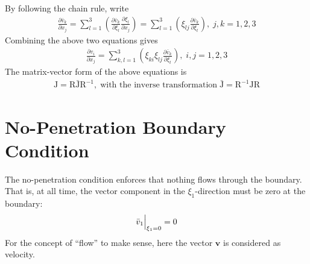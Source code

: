 \documentclass[a4paper,12pt,dvips]{article}
\begin{document}
By following the chain rule, write
\begin{align*}
  \frac{\partial \bar{v}_k}{\partial x_j}
  = \sum_{l=1}^3
    \left(
      \frac{\partial \bar{v}_k}{\partial \xi_l}
      \frac{\partial \xi_l}{\partial x_j}
    \right)
  = \sum_{l=1}^3
    \left( \xi_{lj} \frac{\partial \bar{v}_k}{\partial \xi_l} \right),
  \; j,k = 1, 2, 3
\end{align*}
Combining the above two equations gives
\begin{align*}
  \frac{\partial v_i}{\partial x_j}
  = \sum_{k,l=1}^3
    \left(
      \xi_{ki} \xi_{lj} \frac{\partial \bar{v}_k}{\partial \xi_l}
    \right),
  \; i,j = 1, 2, 3
\end{align*}
The matrix-vector form of the above equations is
\begin{align}
  \mathrm{J} = \mathrm{R\bar{J}R^{-1}},
  \; \mbox{with the inverse transformation} \;
  \bar{\mathrm{J}} = \mathrm{R^{-1}JR}
  \label{e:rotjac}
\end{align}

\section{No-Penetration Boundary Condition}

The no-penetration condition enforces that nothing flows through the boundary.
That is, at all time, the vector component in the $\xi_1$-direction must be
zero at the boundary:
\begin{align*}
  \Bigl.\bar{v}_1\Bigr|_{\xi_1=0} = 0
\end{align*}
For the concept of ``flow'' to make sense, here the vector $\mathbf{v}$ is
considered as velocity.
\end{document}
